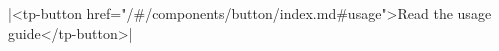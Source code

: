 \documentclass{article}
\begin{document}
\rawhtml|<tp-button href="/#/components/button/index.md#usage">Read the usage guide</tp-button>|
\end{document}

